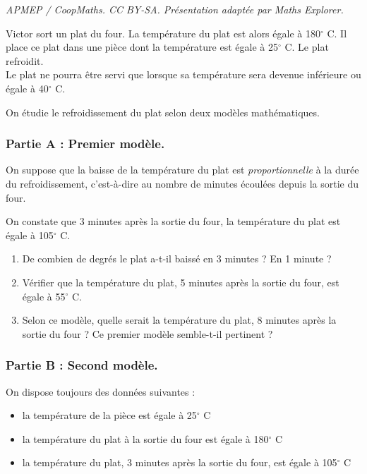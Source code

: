 \documentclass[10pt]{article}
\begin{document}
\noindent\textit{APMEP / CoopMaths. CC BY-SA. Présentation adaptée par Maths Explorer.}\par\medskip
Victor sort un plat du four. La température du plat est alors égale à 180\ensuremath{^\circ} C. Il place ce plat dans une pièce dont la température est égale à 25\ensuremath{^\circ} C. Le plat refroidit. \\
Le plat ne pourra être servi que lorsque sa température sera devenue inférieure ou égale à 40\ensuremath{^\circ} C.

On étudie le refroidissement du plat selon deux modèles mathématiques.

\subsubsection*{Partie A : Premier modèle.}
On suppose que la baisse de la température du plat est \textit{proportionnelle} à la durée du refroidissement, c'est-à-dire au nombre de minutes écoulées depuis la sortie du four.

On constate que 3 minutes après la sortie du four, la température du plat est égale à 105\ensuremath{^\circ} C.

\begin{enumerate}
\item De combien de degrés le plat a-t-il baissé en 3 minutes ? En 1 minute ?

\item Vérifier que la température du plat, 5 minutes après la sortie du four, est égale à 55\ensuremath{^\circ} C.

\item Selon ce modèle, quelle serait la température du plat, 8 minutes après la sortie du four ? Ce premier modèle semble-t-il pertinent ?
\end{enumerate}

\subsubsection*{Partie B : Second modèle.}
On dispose toujours des données suivantes :
\begin{itemize}
\item la température de la pièce est égale à 25\ensuremath{^\circ} C
\item la température du plat à la sortie du four est égale à 180\ensuremath{^\circ} C
\item la température du plat, 3 minutes après la sortie du four, est égale à 105\ensuremath{^\circ} C
\end{itemize}
\end{document}
